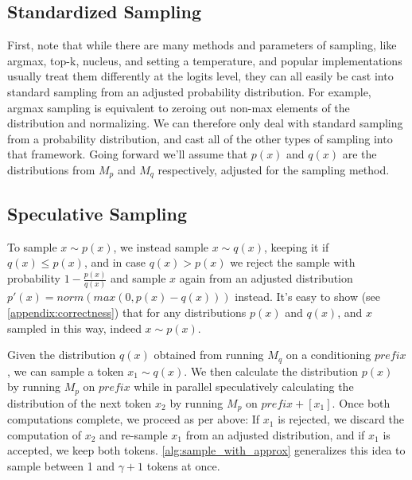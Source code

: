 \documentclass[nohyperref]{article}
\theoremstyle{plain}
\theoremstyle{definition}
\theoremstyle{remark}
\begin{document}
\subsection{Standardized Sampling}
\label{sec:standardized_sampling}
First, note that while there are many methods and parameters of sampling, like argmax, top-k, nucleus, and setting a temperature, and popular implementations usually treat them differently at the logits level, they can all easily be cast into standard sampling from an adjusted probability distribution. For example, argmax sampling is equivalent to zeroing out non-max elements of the distribution and normalizing. We can therefore only deal with standard sampling from a probability distribution, and cast all of the other types of sampling into that framework. Going forward we'll assume that $p(x)$ and $q(x)$ are the distributions from $M_p$ and $M_q$ respectively, adjusted for the sampling method.

\subsection{Speculative Sampling}
\label{sec:speculative_sampling}
To sample $x \sim p(x)$, we instead sample $x \sim q(x)$, keeping it if $q(x) \le p(x)$, and in case $q(x) > p(x)$ we reject the sample with probability $1 - \frac{p(x)}{q(x)}$ and sample $x$ again from an adjusted distribution $p'(x) = norm(max(0, p(x) - q(x)))$ instead. It’s easy to show (see \cref{appendix:correctness}) that for any distributions $p(x)$ and $q(x)$, and $x$ sampled in this way, indeed $x \sim p(x)$.

Given the distribution $q(x)$ obtained from running $M_q$ on a conditioning $prefix$, we can sample a token $x_1 \sim q(x)$. We then calculate the distribution $p(x)$ by running $M_p$ on $prefix$ while in parallel speculatively calculating the distribution of the next token $x_2$ by running $M_p$ on $prefix + [x_1]$. Once both computations complete, we proceed as per above: If $x_1$ is rejected, we discard the computation of $x_2$ and re-sample $x_1$ from an adjusted distribution, and if $x_1$ is accepted, we keep both tokens. \cref{alg:sample_with_approx} generalizes this idea to sample between 1 and $\gamma + 1$ tokens at once.


\newcommand{\COMMENTLLAMA}[1]{{\color{darkgreen} $\triangleright$ {#1}}}
\end{document}
